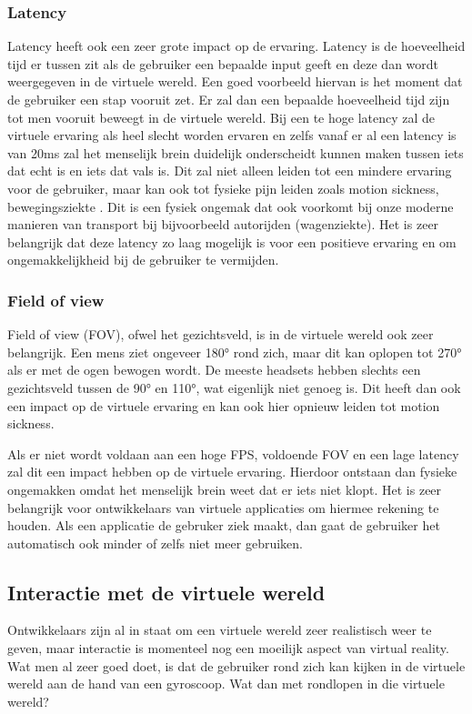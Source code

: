 \subsubsection{Latency}
\label{ssubsec:latency}
Latency heeft ook een zeer grote impact op de ervaring. Latency is de hoeveelheid tijd er tussen zit als de gebruiker een bepaalde input geeft en deze dan wordt weergegeven in de virtuele wereld. Een goed voorbeeld hiervan is het moment dat de gebruiker een stap vooruit zet. Er zal dan een bepaalde hoeveelheid tijd zijn tot men vooruit beweegt in de virtuele wereld. Bij een te hoge latency zal de virtuele ervaring als heel slecht worden ervaren en zelfs vanaf er al een latency is van 20ms zal het menselijk brein duidelijk onderscheidt kunnen maken tussen iets dat echt is en iets dat vals is. Dit zal niet alleen leiden tot een mindere ervaring voor de gebruiker, maar kan ook tot fysieke pijn leiden zoals motion sickness, bewegingsziekte \autocite{Pappas2016}. Dit is een fysiek ongemak dat ook voorkomt bij onze moderne manieren van transport bij bijvoorbeeld autorijden (wagenziekte). Het is zeer belangrijk dat deze latency zo laag mogelijk is voor een positieve ervaring en om ongemakkelijkheid bij de gebruiker te vermijden.

\subsubsection{Field of view}
\label{ssubsec:fov}
Field of view (FOV), ofwel het gezichtsveld, is in de virtuele wereld ook zeer belangrijk. Een mens ziet ongeveer 180° rond zich, maar dit kan oplopen tot 270° als er met de ogen bewogen wordt. De meeste headsets hebben slechts een gezichtsveld tussen de 90° en 110°, wat eigenlijk niet genoeg is. Dit heeft dan ook een impact op de virtuele ervaring en kan ook hier opnieuw leiden tot motion sickness.

Als er niet wordt voldaan aan een hoge FPS, voldoende FOV en een lage latency zal dit een impact hebben op de virtuele ervaring. Hierdoor ontstaan dan fysieke ongemakken omdat het menselijk brein weet dat er iets niet klopt. Het is zeer belangrijk voor ontwikkelaars van virtuele applicaties om hiermee rekening te houden. Als een applicatie de gebruker ziek maakt, dan gaat de gebruiker het automatisch ook minder of zelfs niet meer gebruiken.

\subsection{Interactie met de virtuele wereld}
\label{subsec:interactie-vr}
Ontwikkelaars zijn al in staat om een virtuele wereld zeer realistisch weer te geven, maar interactie is momenteel nog een moeilijk aspect van virtual reality. Wat men al zeer goed doet, is dat de gebruiker rond zich kan kijken in de virtuele wereld aan de hand van een gyroscoop. Wat dan met rondlopen in die virtuele wereld?

